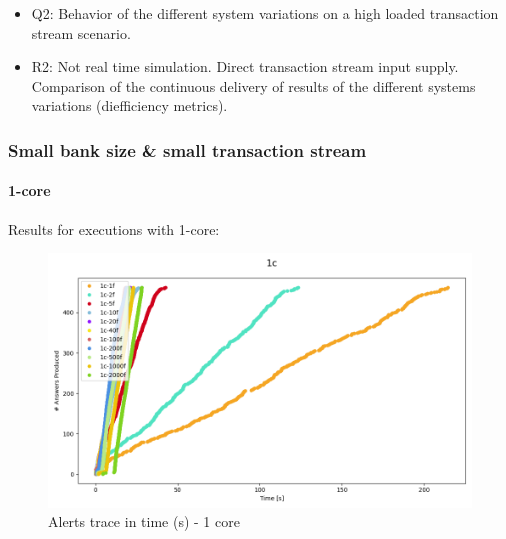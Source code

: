 \begin{itemize}
  \item Q2: Behavior of the different system variations on a high loaded transaction stream scenario.
  \item R2: Not real time simulation. Direct transaction stream input supply. Comparison of the continuous delivery of results of the different systems variations (diefficiency metrics).
\end{itemize}

\subsubsection{Small bank size \& small transaction stream}

\paragraph{1-core\\}


Results for executions with 1-core:

\begin{figure}[H]
  \centering
  \includegraphics[scale = 0.5]{images/4-Experiments/E2/fixedcores/1c/traces.png}
  \caption{Alerts trace in time (s) - 1 core}
\end{figure}

